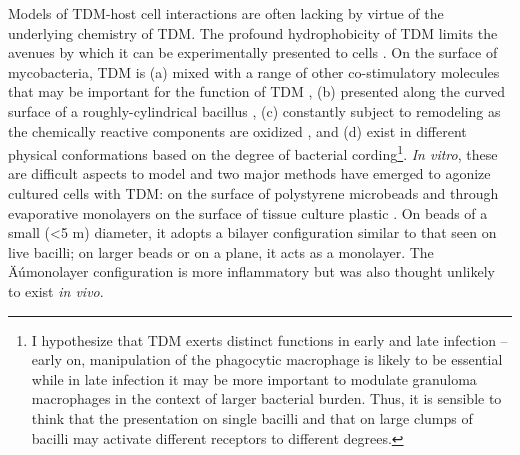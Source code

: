 Models of TDM-host cell interactions are often lacking by virtue of the underlying chemistry of TDM. The profound hydrophobicity of TDM limits the avenues by which it can be experimentally presented to cells \citep{For instance, direct addition of TDM to tissue culture media would result in a film at the surface, or at best, seemingly inert micelles.}. On the surface of mycobacteria, TDM is (a) mixed with a range of other co-stimulatory molecules that may be important for the function of TDM \citep{Mazurek2012, Torrelles2010}, (b) presented along the curved surface of a roughly-cylindrical bacillus \citep{McCarter1935},  (c) constantly subject to remodeling as the chemically reactive components are oxidized \citep{Hett2010, Meniche2014, Shaku2020}, and (d) exist in different physical conformations based on the degree of bacterial cording\footnote{I hypothesize that TDM exerts distinct functions in early and late infection -- early on, manipulation of the phagocytic macrophage is likely to be essential while in late infection it may be more important to modulate granuloma macrophages in the context of larger bacterial burden. Thus, it is sensible to think that the presentation on single bacilli and that on large clumps of bacilli may activate different receptors to different degrees.}. \textit{In vitro}, these are difficult aspects to model and two major methods have emerged to agonize cultured cells with TDM: on the surface of polystyrene microbeads \citep{Bloch1950, Bowdish2009, Indrigo2003, Retzinger1982, Behling1993, Geisel2005} and through evaporative monolayers on the surface of tissue culture plastic \citep{Schabbing1994, Harland2008, Hunter2006, Ishikawa2009, Zhao2014, Mikaye}. On beads of a small (<5 \textmu m) diameter, it adopts a bilayer configuration similar to that seen on live bacilli; on larger beads or on a plane, it acts as a monolayer. The Äúmonolayer configuration is more inflammatory but was also thought unlikely to exist \textit{in vivo}. 


